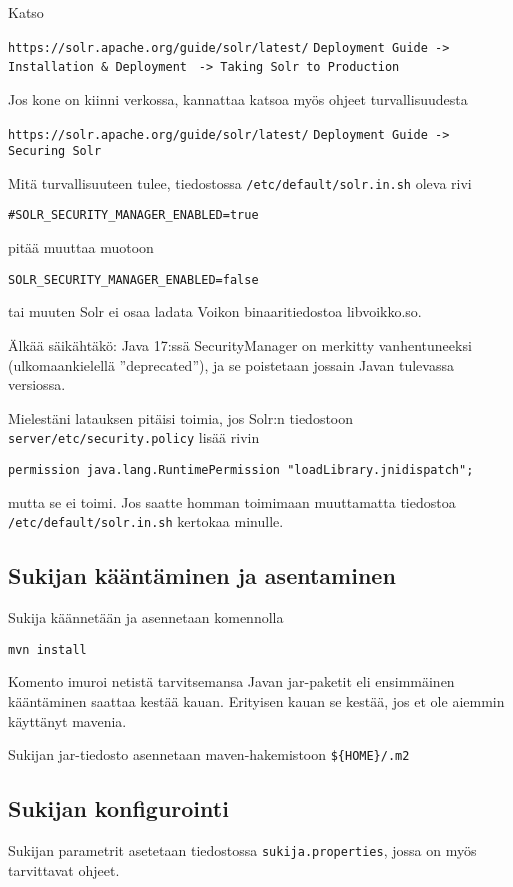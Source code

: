 \documentclass[12pt]{article}
\begin{document}
Katso

\verb=https://solr.apache.org/guide/solr/latest/=
\verb=Deployment Guide -> Installation & Deployment=
\verb= -> Taking Solr to Production=


Jos kone on kiinni verkossa, kannattaa katsoa myös ohjeet turvallisuudesta

\verb=https://solr.apache.org/guide/solr/latest/=
\verb=Deployment Guide -> Securing Solr=

Mitä turvallisuuteen tulee,
tiedostossa \verb|/etc/default/solr.in.sh| oleva rivi

\verb|#SOLR_SECURITY_MANAGER_ENABLED=true|

pitää muuttaa muotoon

\verb|SOLR_SECURITY_MANAGER_ENABLED=false|

tai muuten Solr ei osaa ladata Voikon binaaritiedostoa libvoikko.so.


\bigskip\noindent
Älkää säikähtäkö: Java 17:ssä SecurityManager on merkitty
vanhentuneeksi (ulkomaankielellä ''deprecated''), ja se poistetaan
jossain Javan tulevassa versiossa.

Mielestäni latauksen pitäisi toimia, jos Solr:n tiedostoon
\verb=server/etc/security.policy= lisää rivin

\verb|permission java.lang.RuntimePermission "loadLibrary.jnidispatch";|

mutta se ei toimi. Jos saatte homman toimimaan muuttamatta tiedostoa
\verb|/etc/default/solr.in.sh| kertokaa minulle.


\newpage
\subsection*{Sukijan kääntäminen ja asentaminen}

Sukija käännetään ja asennetaan komennolla

\verb=mvn install=

Komento imuroi netistä tarvitsemansa Javan jar-paketit eli ensimmäinen
kääntäminen saattaa kestää kauan. Erityisen kauan se kestää, jos et
ole aiemmin käyttänyt mavenia.

Sukijan jar-tiedosto asennetaan maven-hakemistoon \verb|${HOME}/.m2|


\subsection*{Sukijan konfigurointi}

Sukijan parametrit asetetaan tiedostossa \verb|sukija.properties|,
jossa on myös tarvittavat ohjeet.
\end{document}
